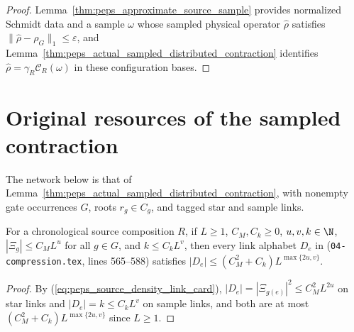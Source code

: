\begin{proof}
    \leanok
    Lemma~\ref{thm:peps_approximate_source_sample}
    provides normalized Schmidt data and a sample $\omega$ whose sampled
    physical operator $\widehat\rho$ satisfies
    $\|\widehat\rho-\rho_G\|_1\le\varepsilon$, and
    Lemma~\ref{thm:peps_actual_sampled_distributed_contraction} identifies
    $\widehat\rho=\gamma_R\mathcal C_R(\omega)$ in these configuration bases.
\end{proof}

\section{Original resources of the sampled contraction}

The network below is that of
Lemma~\ref{thm:peps_actual_sampled_distributed_contraction}, with nonempty
gate occurrences $G$, roots $r_g\in C_g$, and tagged star and sample links.

\begin{lemma}
    \label{thm:peps_actual_density_alphabet_power}
    \leanok
    For a chronological source composition $R$, if $L\geq1$, $C_M,C_k\geq0$,
    $u,v,k\in\N$, $|\Xi_g|\leq C_M L^u$ for all $g\in G$, and $k\leq C_k L^v$,
    then every link alphabet $D_e$ in
    \cite[proof of Theorem~5.2]{OpenAI2026PolynomialPEPS}
    (\texttt{04-compression.tex}, lines 565--588) satisfies
    $|D_e|\leq(C_M^2+C_k)L^{\max\{2u,v\}}$.
\end{lemma}

\begin{proof}
    \leanok
    By (\ref{eq:peps_source_density_link_card}), $|D_e|=|\Xi_{g(e)}|^2\le C_M^2 L^{2u}$
    on star links and $|D_e|=k\le C_k L^v$ on sample links, and both are at most
    $(C_M^2+C_k)L^{\max\{2u,v\}}$ since $L\ge 1$.
\end{proof}

